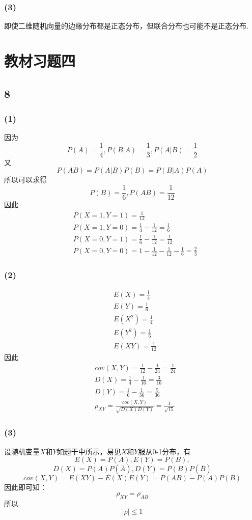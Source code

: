 \documentclass[twocolumn]{article}
\begin{document}
\begin{CJK}{UTF8}{gbsn}
			\subsubsection*{(3)}
				即使二维随机向量的边缘分布都是正态分布，但联合分布也可能不是正态分布.
			\section*{教材习题四}
			\subsection*{8}
			\subsubsection*{(1)}
				因为\[P(A)=\frac{1}{4},P(B|A)=\frac{1}{3},P(A|B)=\frac{1}{2}\]又\[P(AB)=P(A|B)P(B)=P(B|A)P(A)\]所以可以求得\[P(B)=\frac{1}{6},P(AB)=\frac{1}{12}\]因此\begin{align*}
					& P(X=1,Y=1) = \frac{1}{12}\\
					& P(X=1,Y=0) = \frac{1}{4}-\frac{1}{12}=\frac{1}{6}\\
					& P(X=0,Y=1) = \frac{1}{6}-\frac{1}{12}=\frac{1}{12}\\
					& P(X=0,Y=0) = 1-\frac{1}{12}-\frac{1}{12}-\frac{1}{6}=\frac{2}{3}
				\end{align*}
			\subsubsection*{(2)}
				\begin{align*}
					& E(X) = \frac{1}{4}\\
					& E(Y) = \frac{1}{6}\\
					& E(X^2) = \frac{1}{4}\\
					& E(Y^2) = \frac{1}{6}\\
					& E(XY) = \frac{1}{12}
				\end{align*}
				因此\begin{align*}
					& cov(X,Y)=\frac{1}{12}-\frac{1}{24}=\frac{1}{24}\\
					& D(X) = \frac{1}{4}-\frac{1}{16}=\frac{3}{16}\\
					& D(Y) = \frac{1}{6}-\frac{1}{36}=\frac{5}{36}\\
					& \rho_{XY}=\frac{cov(X,Y)}{\sqrt{D(X)D(Y)}}=\frac{1}{\sqrt{15}}
				\end{align*}
			\subsubsection*{(3)}
				设随机变量$X$和$Y$如题干中所示，易见$X$和$Y$服从0-1分布，有\[E(X)=P(A),E(Y)=P(B),\]\[D(X)=P(A)P(\overline{A}),D(Y)=P(B)P(\overline{B})\]\[cov(X,Y)=E(XY)-E(X)E(Y)=P(AB)-P(A)P(B)\]因此即可知：\[\rho_{XY}=\rho_{AB}\]所以\[|\rho|\le1\]	

\end{CJK}
\end{document}
